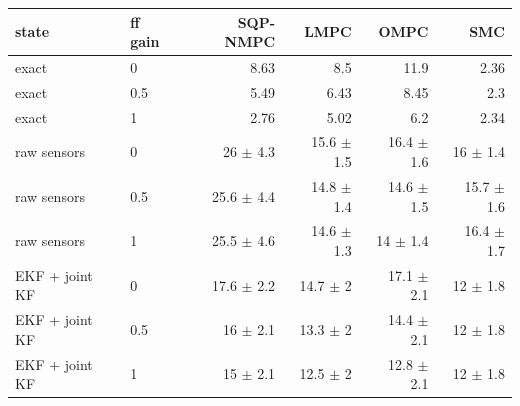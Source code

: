 \begin{tabular}{llrrrr}
\toprule
state & ff gain & SQP-NMPC & LMPC & OMPC & SMC \\
\midrule
exact & 0 & 8.63 & 8.5 & 11.9 & 2.36 \\
exact & 0.5 & 5.49 & 6.43 & 8.45 & 2.3 \\
exact & 1 & 2.76 & 5.02 & 6.2 & 2.34 \\
\addlinespace
raw sensors & 0 & 26 $\pm$ 4.3 & 15.6 $\pm$ 1.5 & 16.4 $\pm$ 1.6 & 16 $\pm$ 1.4 \\
raw sensors & 0.5 & 25.6 $\pm$ 4.4 & 14.8 $\pm$ 1.4 & 14.6 $\pm$ 1.5 & 15.7 $\pm$ 1.6 \\
raw sensors & 1 & 25.5 $\pm$ 4.6 & 14.6 $\pm$ 1.3 & 14 $\pm$ 1.4 & 16.4 $\pm$ 1.7 \\
\addlinespace
EKF + joint KF & 0 & 17.6 $\pm$ 2.2 & 14.7 $\pm$ 2 & 17.1 $\pm$ 2.1 & 12 $\pm$ 1.8 \\
EKF + joint KF & 0.5 & 16 $\pm$ 2.1 & 13.3 $\pm$ 2 & 14.4 $\pm$ 2.1 & 12 $\pm$ 1.8 \\
EKF + joint KF & 1 & 15 $\pm$ 2.1 & 12.5 $\pm$ 2 & 12.8 $\pm$ 2.1 & 12 $\pm$ 1.8 \\
\bottomrule
\end{tabular}
